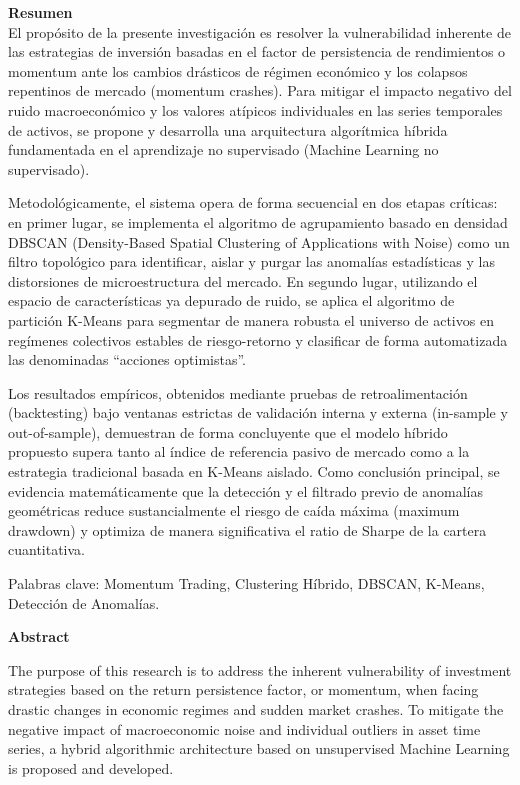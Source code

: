 \documentclass[
]{article}
\begin{document}
	\textbf{\Large Resumen}\\
	
	El propósito de la presente investigación es resolver la vulnerabilidad inherente de las estrategias de inversión basadas en el factor de persistencia de rendimientos o momentum ante los cambios drásticos de régimen económico y los colapsos repentinos de mercado (momentum crashes). Para mitigar el impacto negativo del ruido macroeconómico y los valores atípicos individuales en las series temporales de activos, se propone y desarrolla una arquitectura algorítmica híbrida fundamentada en el aprendizaje no supervisado (Machine Learning no supervisado).
	
	Metodológicamente, el sistema opera de forma secuencial en dos etapas críticas: en primer lugar, se implementa el algoritmo de agrupamiento basado en densidad DBSCAN (Density-Based Spatial Clustering of Applications with Noise) como un filtro topológico para identificar, aislar y purgar las anomalías estadísticas y las distorsiones de microestructura del mercado. En segundo lugar, utilizando el espacio de características ya depurado de ruido, se aplica el algoritmo de partición K-Means para segmentar de manera robusta el universo de activos en regímenes colectivos estables de riesgo-retorno y clasificar de forma automatizada las denominadas ``acciones optimistas''.
	
	Los resultados empíricos, obtenidos mediante pruebas de retroalimentación (backtesting) bajo ventanas estrictas de validación interna y externa (in-sample y out-of-sample), demuestran de forma concluyente que el modelo híbrido propuesto supera tanto al índice de referencia pasivo de mercado como a la estrategia tradicional basada en K-Means aislado. Como conclusión principal, se evidencia matemáticamente que la detección y el filtrado previo de anomalías geométricas reduce sustancialmente el riesgo de caída máxima (maximum drawdown) y optimiza de manera significativa el ratio de Sharpe de la cartera cuantitativa.
	
	Palabras clave: Momentum Trading, Clustering Híbrido, DBSCAN, K-Means, Detección de Anomalías.
	
	\newpage
	
	\textbf{\Large Abstract}
	
	The purpose of this research is to address the inherent vulnerability of investment strategies based on the return persistence factor, or momentum, when facing drastic changes in economic regimes and sudden market crashes. To mitigate the negative impact of macroeconomic noise and individual outliers in asset time series, a hybrid algorithmic architecture based on unsupervised Machine Learning is proposed and developed.
	
\end{document}
